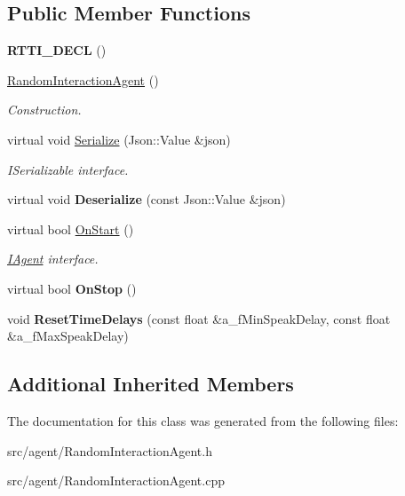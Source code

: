 \subsection*{Public Member Functions}
\begin{DoxyCompactItemize}
\item 
\mbox{\label{class_random_interaction_agent_a14220870a94b172720cbbb95a7688fa9}} 
{\bfseries R\+T\+T\+I\+\_\+\+D\+E\+CL} ()
\item 
\mbox{\label{class_random_interaction_agent_ab274f71d40d90b336130febb6990b17c}} 
\hyperlink{class_random_interaction_agent_ab274f71d40d90b336130febb6990b17c}{Random\+Interaction\+Agent} ()
\begin{DoxyCompactList}\small\item\em Construction. \end{DoxyCompactList}\item 
\mbox{\label{class_random_interaction_agent_a827c7e50791681c2eb0033b7b06a57c1}} 
virtual void \hyperlink{class_random_interaction_agent_a827c7e50791681c2eb0033b7b06a57c1}{Serialize} (Json\+::\+Value \&json)
\begin{DoxyCompactList}\small\item\em I\+Serializable interface. \end{DoxyCompactList}\item 
\mbox{\label{class_random_interaction_agent_a02710489b8921f67726e3466e4acabca}} 
virtual void {\bfseries Deserialize} (const Json\+::\+Value \&json)
\item 
\mbox{\label{class_random_interaction_agent_a39931fcdca032e1c5dee0045fb524180}} 
virtual bool \hyperlink{class_random_interaction_agent_a39931fcdca032e1c5dee0045fb524180}{On\+Start} ()
\begin{DoxyCompactList}\small\item\em \hyperlink{class_i_agent}{I\+Agent} interface. \end{DoxyCompactList}\item 
\mbox{\label{class_random_interaction_agent_acd33efc92707b245438988b0da24033d}} 
virtual bool {\bfseries On\+Stop} ()
\item 
\mbox{\label{class_random_interaction_agent_a962691bed190f1a1ec39ab1e085b0365}} 
void {\bfseries Reset\+Time\+Delays} (const float \&a\+\_\+f\+Min\+Speak\+Delay, const float \&a\+\_\+f\+Max\+Speak\+Delay)
\end{DoxyCompactItemize}
\subsection*{Additional Inherited Members}


The documentation for this class was generated from the following files\+:\begin{DoxyCompactItemize}
\item 
src/agent/Random\+Interaction\+Agent.\+h\item 
src/agent/Random\+Interaction\+Agent.\+cpp\end{DoxyCompactItemize}
